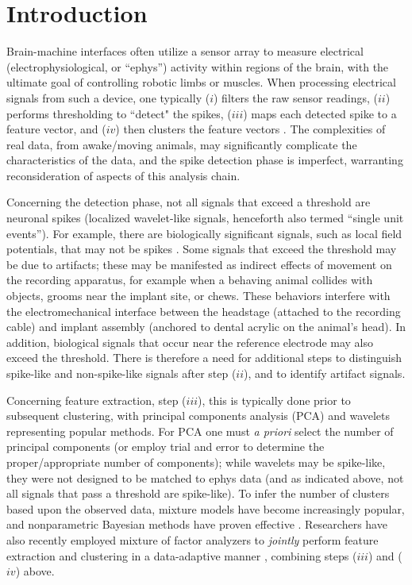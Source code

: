 \documentclass[journal]{IEEEtran}
\begin{document}
\section{Introduction\label{sec:intro}}

Brain-machine interfaces often utilize a sensor array to measure electrical (electrophysiological, or ``ephys'') activity within regions of the brain, with the ultimate goal of controlling robotic limbs \cite{Nature2012} or muscles. When processing electrical signals from such a device, one typically ($i$) filters the raw sensor readings, ($ii$) performs thresholding
to ``detect" the spikes, ($iii$) maps each detected spike to a
feature vector, and ($iv$) then clusters the feature vectors
\cite{Lewicki}. The complexities of real data, from awake/moving animals, may significantly complicate the characteristics of the data, and the spike detection phase is imperfect, warranting reconsideration of aspects of this analysis chain.

Concerning the detection phase, not all signals that exceed a threshold are neuronal spikes (localized wavelet-like signals, henceforth also termed ``single unit events''). For example, there are biologically significant signals, such as local field potentials, that may not be spikes \cite{Donoghue07}. Some signals that exceed the threshold may be due to artifacts; these may be manifested as indirect effects of movement on the recording apparatus, for example when a behaving animal collides with objects, grooms near the implant site, or chews. These behaviors interfere with the electromechanical interface between the headstage (attached to the recording cable) and implant assembly
(anchored to dental acrylic on the animal's head).  In addition, biological signals that occur near the reference electrode may also exceed the threshold.  There is therefore a need for additional steps to distinguish spike-like and non-spike-like signals after step ($ii$), and to identify artifact signals.

Concerning feature extraction, step ($iii$), this is typically done prior to subsequent clustering, with principal components analysis (PCA) \cite{Lewicki} and wavelets \cite{Letelier2000} representing popular methods. For PCA one must \emph{a priori} select the number of principal components (or employ trial and error to determine the proper/appropriate number of components); while wavelets may be spike-like, they were not designed to be matched to ephys data (and as indicated above, not all signals that pass a threshold are spike-like). To infer the number of clusters based upon the observed data, mixture models have become increasingly popular, and nonparametric Bayesian methods have proven effective \cite{Wood2009,Bo2011}. Researchers have also recently employed mixture of factor analyzers to \emph{jointly} perform feature extraction and clustering in a data-adaptive manner \cite{Dilan,Bo2011}, combining steps ($iii$) and ($iv$) above.
\end{document}
